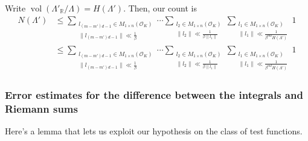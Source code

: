 \documentclass{amsart}
\newcommand{\OK}{\mathcal{O}_K}
\DeclareMathOperator{\vol}{vol}
\begin{document}
Write $\vol(\Lambda'_{\mathbb{R}}/\Lambda) = H(\Lambda')$. Then, our count is 
\begin{align}
  N(\Lambda') 
  & \leq  
  \sum_{\substack{l_{ (m-m')d - 1 } \in M_{1 \times n}(\OK)  \\ \|l_{(m-m')d-1}\| \ll \frac{1}{\beta}}}
  \cdots
  \sum_{\substack{l_2 \in M_{1 \times n}(\OK)  \\ \|l_2\| \ll \frac{1}{\beta \|l_1\|}}}
  \sum_{\substack{l_1 \in M_{1 \times n}(\OK)  \\  \|l_1\| \ll \frac{1}{\beta^{md}H(\Lambda')} }} 1\\
  & \leq  
  \sum_{\substack{l_{ (m-m')d - 1 } \in M_{1 \times n}(\OK)  \\ \|l_{(m-m')d-1}\| \ll \frac{1}{\beta}}}
  \cdots
  \sum_{\substack{l_2 \in M_{1 \times n}(\OK)  \\ \|l_2\| \ll \frac{1}{\beta \|l_1\|}}}
  \sum_{\substack{l_1 \in M_{1 \times n}(\OK)  \\  \|l_1\| \ll \frac{1}{\beta^{md}H(\Lambda')} }} 1
\end{align}

\fi

\subsubsection{Error estimates for the difference between the integrals and Riemann sums}

Here's a lemma that lets us exploit our hypothesis on the class of test functions.
\end{document}
